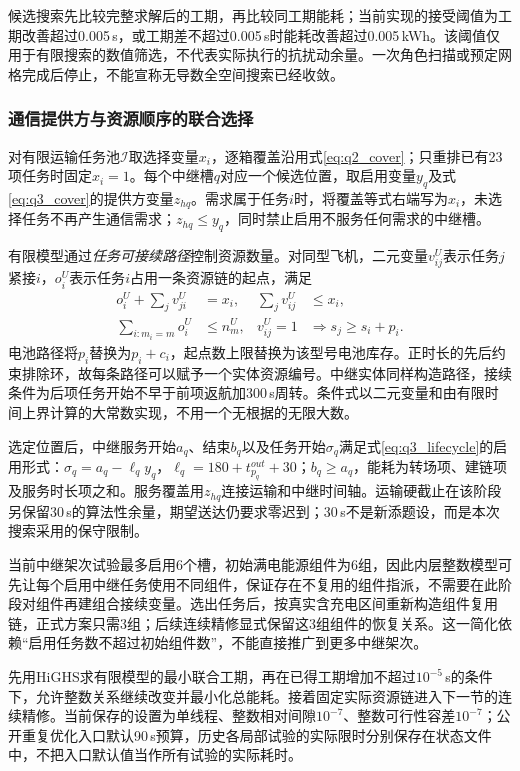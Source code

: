 候选搜索先比较完整求解后的工期，再比较同工期能耗；当前实现的接受阈值为工期改善超过0.005\,s，或工期差不超过0.005\,s时能耗改善超过0.005\,kWh。该阈值仅用于有限搜索的数值筛选，不代表实际执行的抗扰动余量。一次角色扫描或预定网格完成后停止，不能宣称无导数全空间搜索已经收敛。

\subsubsection{通信提供方与资源顺序的联合选择}
对有限运输任务池$\mathcal I$取选择变量$x_i$，逐箱覆盖沿用式\eqref{eq:q2_cover}；只重排已有23项任务时固定$x_i=1$。每个中继槽$q$对应一个候选位置，取启用变量$y_q$及式\eqref{eq:q3_cover}的提供方变量$z_{hq}$。需求属于任务$i$时，将覆盖等式右端写为$x_i$，未选择任务不再产生通信需求；$z_{hq}\le y_q$，同时禁止启用不服务任何需求的中继槽。

有限模型通过\emph{任务可接续路径}控制资源数量。对同型飞机，二元变量$v^U_{ij}$表示任务$j$紧接$i$，$o_i^U$表示任务$i$占用一条资源链的起点，满足
\begin{equation}
\begin{aligned}
 o_i^U+\sum_jv^U_{ji}&=x_i,&\sum_jv^U_{ij}&\le x_i,\\
 \sum_{i:m_i=m}o_i^U&\le n_m^U,&
 v^U_{ij}=1&\Rightarrow s_j\ge s_i+p_i .
\end{aligned}
\label{eq:q3_transport_paths}
\end{equation}
电池路径将$p_i$替换为$p_i+c_i$，起点数上限替换为该型号电池库存。正时长的先后约束排除环，故每条路径可以赋予一个实体资源编号。中继实体同样构造路径，接续条件为后项任务开始不早于前项返航加300\,s周转。条件式以二元变量和由有限时间上界计算的大常数实现，不用一个无根据的无限大数。

选定位置后，中继服务开始$a_q$、结束$b_q$以及任务开始$\sigma_q$满足式\eqref{eq:q3_lifecycle}的启用形式：$\sigma_q=a_q-\ell_qy_q$，$\ell_q=180+t^{out}_{p_q}+30$；$b_q\ge a_q$，能耗为转场项、建链项及服务时长项之和。服务覆盖用$z_{hq}$连接运输和中继时间轴。运输硬截止在该阶段另保留30\,s的算法性余量，期望送达仍要求零迟到；30\,s不是新添题设，而是本次搜索采用的保守限制。

当前中继架次试验最多启用6个槽，初始满电能源组件为6组，因此内层整数模型可先让每个启用中继任务使用不同组件，保证存在不复用的组件指派，不需要在此阶段对组件再建组合接续变量。选出任务后，按真实含充电区间重新构造组件复用链，正式方案只需3组；后续连续精修显式保留这3组组件的恢复关系。这一简化依赖“启用任务数不超过初始组件数”，不能直接推广到更多中继架次。

先用HiGHS求有限模型的最小联合工期，再在已得工期增加不超过$10^{-5}$\,s的条件下，允许整数关系继续改变并最小化总能耗。接着固定实际资源链进入下一节的连续精修。当前保存的设置为单线程、整数相对间隙$10^{-7}$、整数可行性容差$10^{-7}$；公开重复优化入口默认90\,s预算，历史各局部试验的实际限时分别保存在状态文件中，不把入口默认值当作所有试验的实际耗时。

